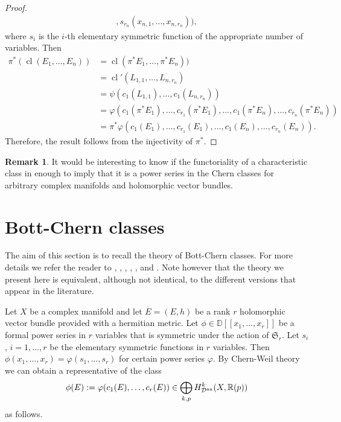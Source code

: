 \documentclass[10pt,twoside]{article}
\numberwithin{equation}{section}
\theoremstyle{plain}
\theoremstyle{definition}
\newtheorem{remark}[equation]{Remark}
\DeclareMathOperator{\cl}{cl}
\newcommand{\an}{\text{{\rm an}}}
\begin{document}
\begin{proof}
\begin{multline*}
    ,s_{r_{n}}(x_{n,1},\dots ,x_{n,r_{n}})),
  \end{multline*}
  where $s_{i}$ is the $i$-th elementary symmetric function of the
  appropriate number of variables.
  Then
  \begin{align*}
    \pi ^{\ast}(\cl(E_{1},\dots , E_{n}))&=
    \cl(\pi ^{\ast}E_{1},\dots , \pi ^{\ast} E_{n}))\\
    &=\cl'(L_{1,1},\dots ,L_{n,r_{n}})\\
    &= \psi (c_{1}(L_{1,1}),\dots ,c_{1}(L_{n,r_{n}}))\\
    &= \varphi(c_{1}(\pi ^{\ast}E_{1}),\dots ,c_{r_{1}}(\pi
    ^{\ast}E_{1}),\dots ,c_{1}(\pi ^{\ast}E_{n}),\dots ,c_{r_{n}}(\pi
    ^{\ast}E_{n}))\\
    &=\pi ^{\ast} \varphi(c_{1}(E_{1}),\dots ,c_{r_{1}}(E_{1}),\dots
    ,c_{1}(E_{n}),\dots ,c_{r_{n}}(E_{n})).
  \end{align*}
  Therefore, the result follows from the injectivity of $\pi ^{\ast}$.
\end{proof}

\begin{remark}\label{rem:3}
  It would be interesting to know if the functoriality of a
  characteristic class in enough to imply that it is a power series in
  the Chern classes for arbitrary complex manifolds and holomorphic
  vector bundles. 
\end{remark}



\section{Bott-Chern classes}
\label{sec:bott-chern-forms}



The aim of this section is to recall the theory of Bott-Chern
classes. For more details we 
refer the reader to \cite{BottChern:hvb}, \cite{BismutGilletSoule:at},
\cite{GilletSoule:vbhm}, \cite{Soule:lag}, \cite{BurgosWang:hBC},
\cite{Burgos:hvbcc} 
and \cite{BurgosKramerKuehn:accavb}. Note however that the theory we
present here is equivalent, although not identical, to the different
versions that appear in the literature.

Let $X$ be a complex manifold and let $\overline {E}=(E,h)$ be a rank
$r$ holomorphic vector bundle provided with a hermitian metric. Let
$\phi \in \mathbb{D}[[x_{1},\dots ,x_{r}]]$ be a formal power series
in $r$ variables that is symmetric under the action of
$\mathfrak{S}_{r}$. Let $s_{i}$, 
$i=1,\dots ,r$ be the elementary symmetric functions in $r$
variables. Then $\phi (x_{1},\dots ,x_{r})=\varphi(s_{1},\dots
,s_{r})$ for certain power series $\varphi$. By Chern-Weil theory we
can obtain a representative of the 
class 
\begin{displaymath}
  \phi (E):=\varphi(c_{1}(E),\dots ,c_{r}(E))\in \bigoplus
  _{k,p}H^{k}_{\mathcal{D}^{\an}}(X,\mathbb{R}(p))   
\end{displaymath}
as follows.
\end{document}
